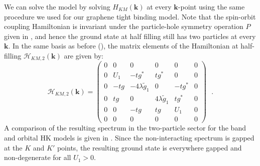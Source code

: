 \documentclass[prb,aps,amssymb,twocolumn,notitlepage]{revtex4-2}
\begin{document}
We can  solve the model by solving $H_{KM}(\mathbf{k})$ at every $\mathbf{k}$-point using the same procedure we used for our graphene tight binding model. 
Note that the spin-orbit coupling Hamiltonian is invariant under the particle-hole symmetry operation $P$ given in , and hence the ground state at half filling still has two particles at every $\mathbf{k}$.
In the same basis as before (), the matrix elements of the Hamiltonian at half-filling $\mathcal{H}_{KM,2}(\mathbf{k})$ are given by:
\begin{equation}
\mathcal{H}_{KM,2}(\mathbf{k})=
\begin{pmatrix}
0&0&0&0&0&0\\
0&U_{1}&-tg^*&tg^*&0&0\\
0&-tg&-4\lambda \tilde{g}_1&0&-tg^*&0\\
0&tg&0&4\lambda \tilde{g}_1&tg^*&0\\
0&0&-tg&tg&U_1&0\\
0&0&0&0&0&0
\end{pmatrix}\text{ }.
\end{equation}
A comparison of the resulting spectrum in the two-particle sector for the band and orbital HK models is given in . 
Since the non-interacting spectrum is gapped at the $K$ and $K'$ points, the resulting ground state is everywhere gapped and non-degenerate for all $U_{1}>0$. 
\end{document}
